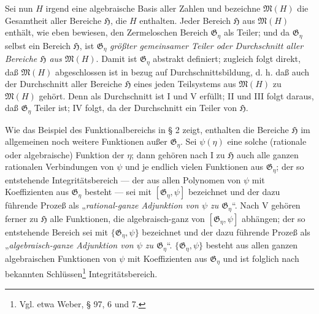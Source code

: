 \documentclass[11pt]{article}
\begin{document}
Sei nun $H$ irgend eine algebraische Basis aller Zahlen und bezeichne
$\mathfrak M(H)$ die Gesamtheit aller Bereiche $\mathfrak H$, die $H$ enthalten.
Jeder Bereich $\mathfrak H$ aus $\mathfrak M(H)$ enthält, wie eben bewiesen, den
Zermeloschen Bereich $\mathfrak G_\eta$ als Teiler; und da $\mathfrak G_\eta$
selbst ein Bereich $\mathfrak H$, ist $\mathfrak G_\eta$ \emph{größter
gemeinsamer Teiler oder Durchschnitt aller Bereiche $\mathfrak H$ aus
$\mathfrak M(H)$}. Damit ist $\mathfrak G_\eta$ abstrakt definiert; zugleich
folgt direkt, daß $\mathfrak M(H)$ abgeschlossen ist in bezug auf
Durchschnittsbildung, d. h. daß auch der Durchschnitt aller Bereiche
$\mathfrak H$ eines jeden Teilsystems aus $\mathfrak M(H)$ zu $\mathfrak M(H)$
gehört. Denn als Durchschnitt ist I und V erfüllt; II und III folgt daraus, daß
$\mathfrak G_\eta$ Teiler ist; IV folgt, da der Durchschnitt ein Teiler von
$\mathfrak H$.

Wie das Beispiel des Funktionalbereichs in § 2 zeigt, enthalten die Bereiche
$\mathfrak H$ im allgemeinen noch weitere Funktionen außer $\mathfrak G_\eta$.
Sei $\psi(\eta)$ eine solche (rationale oder algebraische) Funktion der $\eta$;
dann gehören nach I zu $\mathfrak H$ auch alle ganzen rationalen Verbindungen
von $\psi$ und je endlich vielen Funktionen aus $\mathfrak G_\eta$; der so
entstehende Integritätsbereich --- der aus allen Polynomen von $\psi$ mit
Koeffizienten aus $\mathfrak G_\eta$ besteht --- sei mit $[\mathfrak G_\eta,\psi]$
bezeichnet und der dazu führende Prozeß als „\emph{rational-ganze Adjunktion
von $\psi$ zu $\mathfrak G_\eta$}“. Nach V gehören ferner zu $\mathfrak H$ alle
Funktionen, die algebraisch-ganz von $[\mathfrak G_\eta,\psi]$ abhängen; der so
entstehende Bereich sei mit $\{\mathfrak G_\eta,\psi\}$ bezeichnet und der dazu
führende Prozeß als „\emph{algebraisch-ganze Adjunktion von $\psi$ zu
$\mathfrak G_\eta$}“. $\{\mathfrak G_\eta,\psi\}$ besteht aus allen ganzen
algebraischen Funktionen von $\psi$ mit Koeffizienten aus $\mathfrak G_\eta$ und
ist folglich nach bekannten Schlüssen\footnote{Vgl. etwa Weber, § 97, 6 und 7.}
Integritätsbereich.
\end{document}
